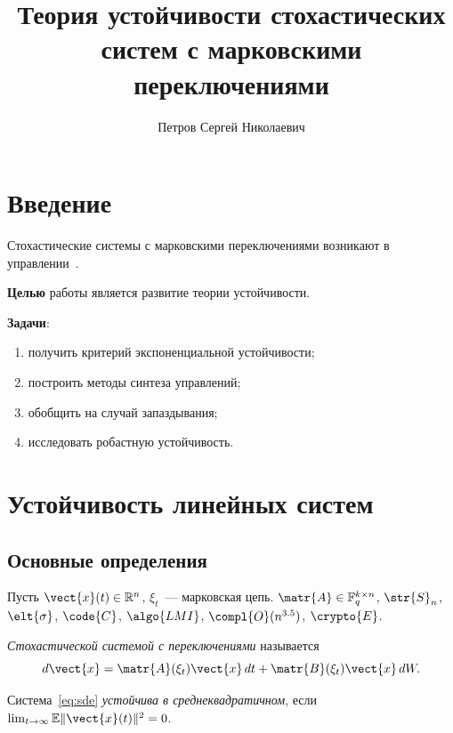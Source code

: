 \documentclass[font=modern]{cmcmsuthesis-doctoral}
\author{Петров Сергей Николаевич}
\title{Теория устойчивости стохастических систем
       с марковскими переключениями}
\begin{document}
\maketitle
\tableofcontents

\chapter*{Введение}

Стохастические системы с марковскими переключениями
возникают в управлении~\cite{shannon1948,macwilliams1979}.

\textbf{Целью} работы является развитие теории устойчивости.

\textbf{Задачи}:
\begin{enumerate}[beginpenalty=10000]
    \item получить критерий экспоненциальной устойчивости;
    \item построить методы синтеза управлений;
    \item обобщить на случай запаздывания;
    \item исследовать робастную устойчивость.
\end{enumerate}

\chapter{Устойчивость линейных систем}\label{ch:stability}

\section{Основные определения}

Пусть $\vect{x}(t)\in\mathbb{R}^n$, $\xi_t$~--- марковская цепь.
$\matr{A}\in\mathbb{F}^{k\times n}_q$, $\str{S}_n$,
$\elt{\sigma}$, $\code{C}$, $\algo{LMI}$,
$\compl{O}(n^{3.5})$, $\crypto{E}$.

\begin{definition}\label{def:system}
\emph{Стохастической системой с переключениями} называется
\begin{equation}\label{eq:sde}
d\vect{x}=\matr{A}(\xi_t)\vect{x}\,dt+\matr{B}(\xi_t)\vect{x}\,dW.
\end{equation}
\end{definition}

\begin{definition}\label{def:ms-stable}
Система~\eqref{eq:sde} \emph{устойчива в среднеквадратичном},
если $\lim_{t\to\infty}\mathbb{E}\|\vect{x}(t)\|^2=0$.
\end{definition}
\end{document}
